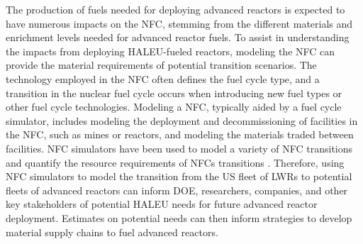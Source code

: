 The production of fuels needed for deploying advanced reactors 
is expected to have numerous impacts on the \gls{NFC}, stemming from 
the different materials and enrichment levels needed for advanced reactor
fuels. To assist in understanding the impacts 
from deploying \gls{HALEU}-fueled reactors, modeling the \gls{NFC} 
can provide the material requirements of potential transition scenarios. 
The technology employed in the \gls{NFC} often defines the fuel 
cycle type, and a transition in the nuclear fuel cycle occurs when 
introducing new fuel types or other fuel cycle technologies.  
Modeling  a \gls{NFC}, typically aided by a fuel cycle simulator, 
includes modeling the deployment and decommissioning of facilities in 
the \gls{NFC}, such as mines or reactors, and modeling the materials 
traded between facilities. 
\gls{NFC} simulators have been used to model a variety of \gls{NFC} 
transitions \cite{sunny_transition_2015,bae_fuel_2018,piet_dynamic_2011} 
and quantify the resource requirements of \glspl{NFC} transitions
\cite{bachmann_enrichment_2021}. Therefore, using \gls{NFC} simulators to 
model the transition from the US fleet of \glspl{LWR} to potential 
fleets of advanced reactors can inform \gls{DOE}, researchers, companies, 
and other key stakeholders of potential \gls{HALEU} needs for future 
advanced reactor deployment. Estimates on potential needs can then inform 
strategies to develop material supply chains to fuel advanced reactors. 

